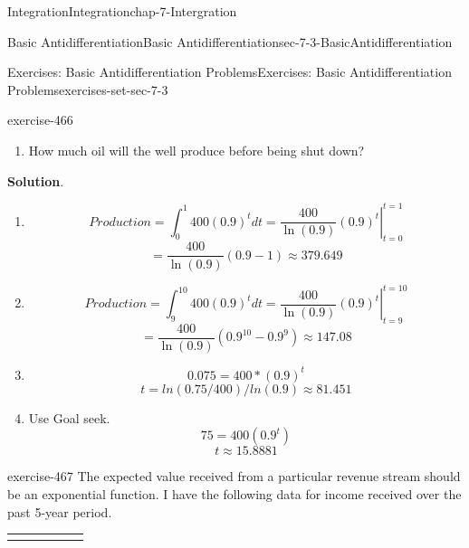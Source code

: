 \documentclass[oneside,10pt,]{book}
\numberwithin{equation}{section}
\newcommand{\hrulethick} {\noalign{\hrule height 0.11em}}
\begin{document}
\begin{chapterptx}{Integration}{}{Integration}{}{}{chap-7-Intergration}
\begin{sectionptx}{Basic Antidifferentiation}{}{Basic Antidifferentiation}{}{}{sec-7-3-BasicAntidifferentiation}
\begin{exercises-subsection-numberless}{Exercises: Basic Antidifferentiation Problems}{}{Exercises: Basic Antidifferentiation Problems}{}{}{exercises-set-sec-7-3}
\begin{divisionexercise}{21}{}{}{exercise-466}
\begin{enumerate}[label=(\alph*)]
\item\hypertarget{li-757}{}\hypertarget{p-2813}{}%
How much oil will the well produce before being shut down?%
\end{enumerate}
\par\smallskip%
\noindent\textbf{Solution}.\hypertarget{solution-236}{}\quad%
\leavevmode%
\begin{enumerate}[label=(\alph*)]
\item\hypertarget{li-758}{}%
\begin{equation*}
Production=\int_0^{1}400(0.9)^t dt
=\left.\frac{400}{\ln(0.9)}  (0.9)^t \right|_{t=0}^{t=1}
\end{equation*}
%
\begin{equation*}
=\frac{400}{\ln(0.9)} (0.9-1)\approx 379.649
\end{equation*}
%
\item\hypertarget{li-759}{}%
\begin{equation*}
Production=\int_9^{10}400(0.9)^t dt
=\left.\frac{400}{\ln(0.9)}  (0.9)^t \right|_{t=9}^{t=10}
\end{equation*}
%
\begin{equation*}
=\frac{400}{\ln(0.9)} (0.9^{10}-0.9^{9})\approx 147.08
\end{equation*}
%
\item\hypertarget{li-760}{}%
\begin{equation*}
0.075=400*(0.9)^t
\end{equation*}
%
\begin{equation*}
t=ln(0.75/400)/ln(0.9)\approx 81.451
\end{equation*}
%
\item\hypertarget{li-761}{}\hypertarget{p-2814}{}%
Use Goal seek.%
%
\begin{equation*}
75=400(0.9^t)
\end{equation*}
%
\begin{equation*}
t\approx 15.8881
\end{equation*}
\end{enumerate}
\end{divisionexercise}%
\begin{divisionexercise}{22}{}{}{exercise-467}%
\hypertarget{p-2815}{}%
The expected value received from a particular revenue stream should be an exponential function.  I have the following data for income received over the past 5-year period.%
\begin{sidebyside}{1}{0}{0}{0}%
\begin{sbspanel}{1}%
{\centering%
\begin{tabular}{cccccc}\hrulethick

\end{tabular}}
\end{sbspanel}
\end{sidebyside}
\end{divisionexercise}
\end{exercises-subsection-numberless}
\end{sectionptx}
\end{chapterptx}
\end{document}
